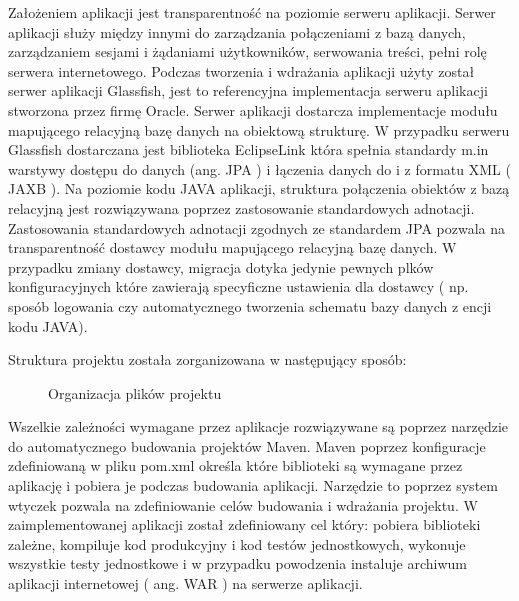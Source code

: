Założeniem aplikacji jest transparentność na poziomie serweru aplikacji. Serwer aplikacji służy między innymi do zarządzania połączeniami z bazą danych, zarządzaniem sesjami i żądaniami użytkowników, serwowania treści, pełni rolę serwera internetowego. Podczas tworzenia i wdrażania aplikacji użyty został serwer aplikacji Glassfish, jest to referencyjna implementacja serweru aplikacji stworzona przez firmę Oracle. Serwer aplikacji dostarcza implementacje modułu mapującego relacyjną bazę danych na obiektową strukturę. W przypadku serweru Glassfish dostarczana jest biblioteka EclipseLink która spełnia standardy m.in warstywy dostępu do danych (ang. JPA ) i łączenia danych do i z formatu XML ( JAXB ). Na poziomie kodu JAVA aplikacji, struktura połączenia obiektów z bazą relacyjną jest rozwiązywana poprzez zastosowanie standardowych adnotacji. Zastosowania standardowych adnotacji zgodnych ze standardem JPA pozwala na transparentność dostawcy modułu mapującego relacyjną bazę danych. W przypadku zmiany dostawcy, migracja dotyka jedynie pewnych plków konfiguracyjnych które zawierają specyficzne ustawienia dla dostawcy ( np. sposób logowania czy automatycznego tworzenia schematu bazy danych z encji kodu JAVA).

Struktura projektu została zorganizowana w następujący sposób:

\begin{figure}

\caption{Organizacja plików projektu}
\end{figure}

Wszelkie zależności wymagane przez aplikacje rozwiązywane są poprzez narzędzie do automatycznego budowania projektów Maven. Maven poprzez konfiguracje zdefiniowaną w pliku pom.xml określa które biblioteki są wymagane przez aplikację i pobiera je podczas budowania aplikacji. Narzędzie to poprzez system wtyczek pozwala na zdefiniowanie celów budowania i wdrażania projektu. W zaimplementowanej aplikacji został zdefiniowany cel który: pobiera biblioteki zależne, kompiluje kod produkcyjny i kod testów jednostkowych, wykonuje wszystkie testy jednostkowe i w przypadku powodzenia instaluje archiwum aplikacji internetowej ( ang. WAR ) na serwerze aplikacji.

